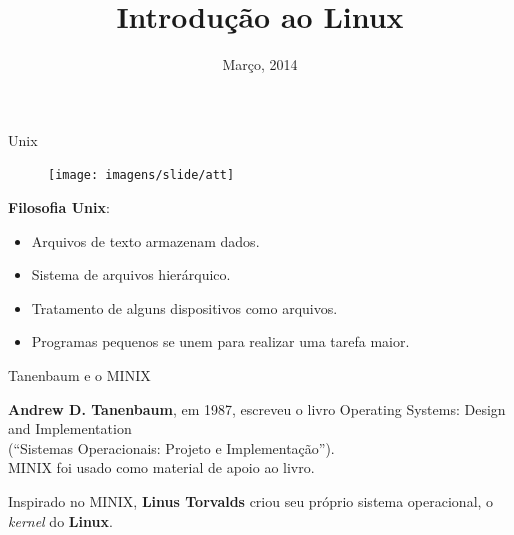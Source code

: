 \documentclass[size=14pt,
style=paintings
]{powerdot}
\title{Introdução ao Linux}
\date{Março, 2014}
\newenvironment{vslide}{\vspace{\stretch{1}}}{\vspace{\stretch{1}}}
\begin{document}
\maketitle

\begin{slide}{Unix}
{
   \begin{figure}[!h]
  \texttt{[image: imagens/slide/att]}
   \end{figure}
}

\textbf{Filosofia Unix}:
\begin{itemize}
\item Arquivos de texto armazenam dados.
\item Sistema de arquivos hierárquico.
\item Tratamento de alguns dispositivos como arquivos.
\item Programas pequenos se unem para realizar uma tarefa maior.
\end{itemize}
\end{slide}

\begin{slide}{Tanenbaum e o MINIX}

\begin{vslide}
\textbf{Andrew D. Tanenbaum}, em 1987, escreveu o livro {\color{blue}Operating Systems: Design and Implementation}\\ (``Sistemas Operacionais: Projeto e Implementação'').
\\
\vspace{.5cm}
MINIX foi usado como material de apoio ao livro.

\vspace{0.5cm}
Inspirado no MINIX, \textbf{Linus Torvalds} criou seu próprio sistema operacional, o \textit{kernel} do \textbf{Linux}.
\vspace{0.5cm}
\end{vslide}

\end{slide}
\end{document}
